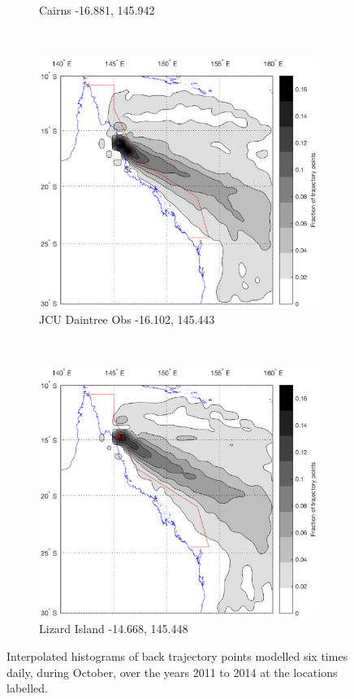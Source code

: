 \begin{figure}[!t]
\begin{subfigure}[b]{0.45\textwidth}
	    \caption{Cairns -16.881, 145.942}
	    \label{subfig:cair}
    \end{subfigure}
	\\
    \begin{subfigure}[b]{0.45\textwidth}
	    \includegraphics[width=\textwidth]{Fig/Research/BT_Coast/Map_108.eps}
	    \caption{JCU Daintree Obs -16.102, 145.443}
	    \label{subfig:cair}
    \end{subfigure}
    ~
    \begin{subfigure}[b]{0.45\textwidth}
	    \includegraphics[width=\textwidth]{Fig/Research/BT_Coast/Map_107.eps}
	    \caption{Lizard Island -14.668, 145.448}
	    \label{subfig:cair}
    \end{subfigure}
    \caption{Interpolated histograms of back trajectory points modelled six times daily, during October, over the years 2011 to 2014 at the locations labelled.}
    \label{fig:btcoastoct}
\end{figure}
